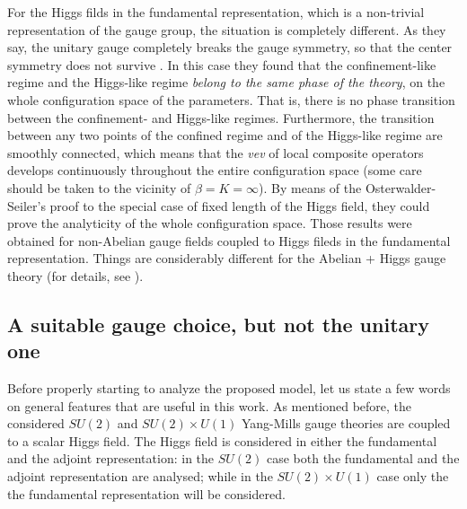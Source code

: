 For the Higgs filds in the fundamental representation, which is a non-trivial representation of
the gauge group, the situation is completely different. As they say, the unitary gauge
completely breaks the gauge symmetry, so that the center symmetry does not survive
\cite{Fradkin:1978dv}. In this case they found that the confinement-like regime and the
Higgs-like regime \emph{belong to the same phase of the theory}, on the whole configuration
space of the parameters. That is, there is no phase transition between the confinement- and
Higgs-like regimes. Furthermore, the transition between any two points of the confined regime
and of the Higgs-like regime are smoothly connected, which means that the \emph{vev} of local
composite operators develops continuously throughout the entire configuration space (some care
should be taken to the vicinity of $\beta =K=\infty$). By means of the Osterwalder-Seiler's
proof to the special case of fixed length of the Higgs field, they could prove the analyticity
of the whole configuration space. Those results were obtained for non-Abelian gauge fields
coupled to Higgs fileds in the fundamental representation. Things are considerably different
for the Abelian + Higgs gauge theory (for details, see \cite{Fradkin:1978dv}).




















\subsection{A suitable gauge choice, but not the unitary one}
\label{suitablegauge}


Before properly starting to analyze the proposed model, let us state a few words on general features that are useful in this work. As mentioned before, the considered $SU(2)$ and $SU(2) \times U(1)$ Yang-Mills gauge theories are coupled to a scalar Higgs field. The Higgs field is considered in either the fundamental and the adjoint representation: in the $SU(2)$ case both the fundamental and the adjoint representation are analysed; while in the $SU(2)\times U(1)$ case only the the fundamental representation will be considered.

